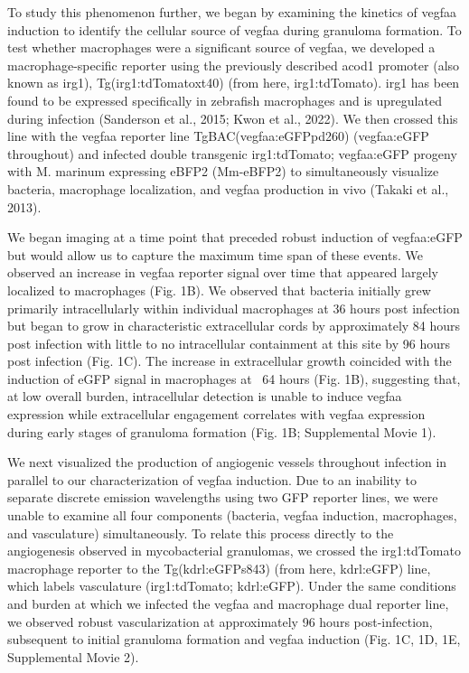 To study this phenomenon further, we began by examining the kinetics of vegfaa induction to identify the cellular source of vegfaa during granuloma formation. To test whether macrophages were a significant source of vegfaa, we developed a macrophage-specific reporter using the previously described acod1 promoter (also known as irg1), Tg(irg1:tdTomatoxt40) (from here, irg1:tdTomato). irg1 has been found to be expressed specifically in zebrafish macrophages and is upregulated during infection (Sanderson et al., 2015; Kwon et al., 2022). We then crossed this line with the vegfaa reporter line TgBAC(vegfaa:eGFPpd260) (vegfaa:eGFP throughout) and infected double transgenic irg1:tdTomato; vegfaa:eGFP progeny with M. marinum expressing eBFP2 (Mm-eBFP2) to simultaneously visualize bacteria, macrophage localization, and vegfaa production in vivo (Takaki et al., 2013).

We began imaging at a time point that preceded robust induction of vegfaa:eGFP but would allow us to capture the maximum time span of these events. We observed an increase in vegfaa reporter signal over time that appeared largely localized to macrophages (Fig. 1B). We observed that bacteria initially grew primarily intracellularly within individual macrophages at 36 hours post infection but began to grow in characteristic extracellular cords by approximately 84 hours post infection with little to no intracellular containment at this site by 96 hours post infection (Fig. 1C). The increase in extracellular growth coincided with the induction of eGFP signal in macrophages at ~64 hours (Fig. 1B), suggesting that, at low overall burden, intracellular detection is unable to induce vegfaa expression while extracellular engagement correlates with vegfaa expression during early stages of granuloma formation (Fig. 1B; Supplemental Movie 1). 

We next visualized the production of angiogenic vessels throughout infection in parallel to our characterization of vegfaa induction. Due to an inability to separate discrete emission wavelengths using two GFP reporter lines, we were unable to examine all four components (bacteria, vegfaa induction, macrophages, and vasculature) simultaneously. To relate this process directly to the angiogenesis observed in mycobacterial granulomas, we crossed the irg1:tdTomato macrophage reporter to the Tg(kdrl:eGFPs843) (from here, kdrl:eGFP) line, which labels vasculature (irg1:tdTomato; kdrl:eGFP). Under the same conditions and burden at which we infected the vegfaa and macrophage dual reporter line, we observed robust vascularization at approximately 96 hours post-infection, subsequent to initial granuloma formation and vegfaa induction (Fig. 1C, 1D, 1E, Supplemental Movie 2). 

